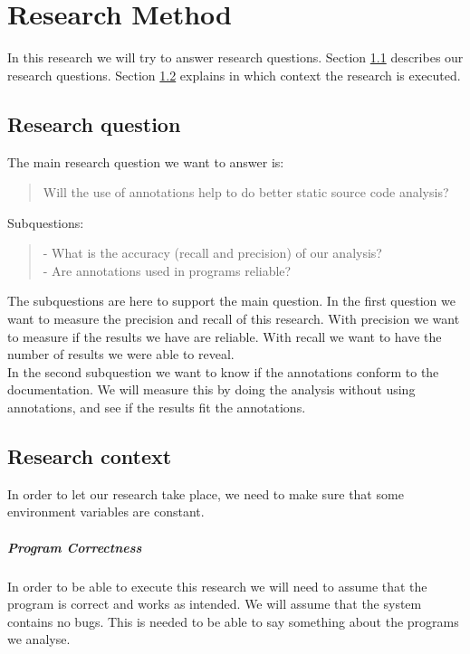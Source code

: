 \documentclass[../main.tex]{subfiles}
\begin{document}
    \chapter{Research Method}\label{chap:research_method}

    In this research we will try to answer research questions.
    Section \ref{sec:research_question} describes our research questions.
    Section \ref{sec:research_context} explains in which context the research is executed.

    \section{Research question}\label{sec:research_question}
    The main research question we want to answer is:
    \\
    \begin{quote}
        Will the use of annotations\footnotemark{} help to do better static source code analysis?
    \end{quote}
    Subquestions:
    \begin{quote}
        - What is the accuracy (recall and precision) of our analysis?
        \\
        - Are annotations used in programs reliable?
    \end{quote}
    The subquestions are here to support the main question. 
    In the first question we want to measure the precision and recall of this research.
    With precision we want to measure if the results we have are reliable.
    With recall we want to have the number of results we were able to reveal.
    \\
    In the second subquestion we want to know if the annotations conform to the documentation.
    We will measure this by doing the analysis without using annotations, and see if the results fit the annotations.    
    
    \section{Research context}\label{sec:research_context}
    In order to let our research take place, we need to make sure that some environment variables are constant.
    
    \paragraph{Program Correctness}
    In order to be able to execute this research we will need to assume that the program is correct and works as intended. 
    We will assume that the system contains no bugs.
    This is needed to be able to say something about the programs we analyse.
    
\end{document}
